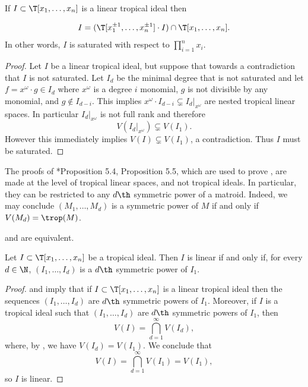 \begin{corollary}\label{cor:LTIsaturated}
If $I\subset \T[x_1,\dots,x_n]$ is a linear tropical ideal then

$$I = (\T[x_1^{\pm1},\dots,x_n^{\pm1}]\cdot I )\cap \T[x_1,\dots,x_n].$$
In other words, $I$ is saturated with respect to $\prod_{i=1}^n x_i$. 
\end{corollary}
\begin{proof}
Let $I$ be a linear tropical ideal, but suppose that towards a contradiction that $I$ is not saturated. Let $I_d$ be the minimal degree that is not saturated and let $f= x^\omega \cdot g\in I_d$ where $x^\omega$ is a degree $i$ monomial, $g$ is not divisible by any monomial, and $g\notin I_{d-i}$. This implies $x^\omega\cdot I_{d-i}\subsetneq I_d|_{x^\omega}$ are nested tropical linear spaces. In particular $I_d|_{x^\omega}$ is not full rank and therefore $$V(I_d|_{x^\omega})\subsetneq V(I_1).$$
However this immediately implies $V(I)\subsetneq V(I_1)$, a contradiction. Thus $I$ must be saturated.
\end{proof}

\begin{remark}\label{rem:bfCharacterisation}
The proofs of \cite{DR19}*{Proposition 5.4, Proposition 5.5}, which are used to prove , are made at the level of tropical linear spaces, and not tropical ideals. In particular, they can be restricted to any $d\th$ symmetric power of a matroid. Indeed, we may conclude $(M_1,\dots,M_d)$ is a symmetric power of $M$ if and only if $V(M_d)= \trop(M)$. 
\end{remark}

\begin{corollary}\label{cor:bfCharacterisation}
 and  are equivalent.
\end{corollary}

\begin{corollary}\label{cor:hfSymprodEquiv}
Let $I\subset \T[x_1,\dots,x_n]$ be a tropical ideal. Then $I$ is linear if and only if, for every $d\in \N$, $(I_1,\dots,I_d)$ is a $d\th$ symmetric power of $I_1$. 
\end{corollary}
\begin{proof}
     and  imply that if $I\subset \T[x_1,\dots,x_n]$ is a linear tropical ideal then the sequences $(I_1,\dots,I_d)$ are $d\th$ symmetric powers of $I_1$. Moreover, if $I$ is a tropical ideal such that $(I_1,\dots,I_d)$ are $d\th$ symmetric powers of $I_1$, then 
    $$V(I) = \bigcap_{d=1}^\infty V(I_d),$$
    where, by , we have $V(I_d)=V(I_1)$. We conclude that
    $$V(I)=\bigcap_{d=1}^\infty V(I_1) = V(I_1),$$
    so $I$ is linear.
\end{proof}

